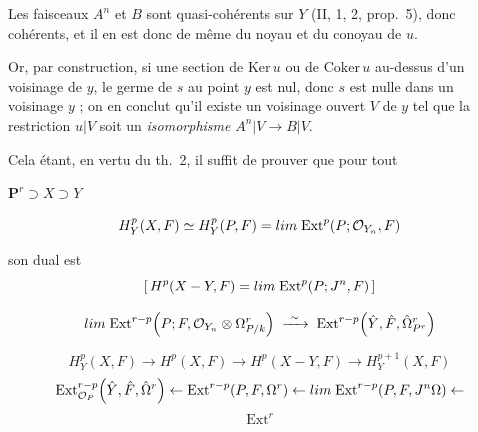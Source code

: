 \documentclass[11pt,a4paper]{article}
\begin{document}
Les faisceaux $A^{n}$ et $B$ sont quasi-cohérents sur $Y$ (II, 1, 2, prop.~5),
donc cohérents, et il en est donc de même du noyau et du conoyau de $u$.


Or, par construction, si  une section de $\mathrm{Ker}\,u$ ou de
$\mathrm{Coker}\,u$ au-dessus d'un voisinage de $y$, le germe de $s$ au point
$y$ est nul, donc $s$ est nulle dans un voisinage  $y$ ; on en conclut
qu'il existe un voisinage ouvert $V$ de $y$ tel que la restriction $u|V$ soit un
\emph{isomorphisme} $A^{n}|V \to B|V$.


Cela étant, en vertu du th.~2, il suffit de prouver que pour tout


\marginal{\ill{}}




 $\mathbf{P}^{r} \supset X \supset Y$

\[
  H^{p}_{Y}(X, F) \simeq H^{p}_{Y}(P, F) = \varinjlim\;
  \mathrm{Ext}^{p}\!\left(P; \mathcal{O}_{Y_{n}}, F\right)
\]

son dual est
\[
  \left[\,H^{p}(X - Y, F) = \varinjlim\;
  \mathrm{Ext}^{p}\!\left(P; J^{n}, F\right)\,\right]
\]

\[
  \varprojlim\; \mathrm{Ext}^{r-p}\!\left(P; F,
  \mathcal{O}_{Y_{n}} \otimes \Omega^{r}_{P/k}\right)
  \;\xrightarrow{\ \sim\ }\;
  \mathrm{Ext}^{r-p}\!\left(\hat{Y}, \hat{F}, \hat{\Omega}^{r}_{P^{r}}\right)
\]

\[
  H^{p}_{Y}(X, F) \to H^{p}(X, F) \to H^{p}(X - Y, F) \to H^{p+1}_{Y}(X, F)
\]
\[
  \mathrm{Ext}^{r-p}_{\mathcal{O}_{P}}\!\left(\hat{Y}, \hat{F}, \hat{\Omega}^{r}\right)
  \leftarrow \mathrm{Ext}^{r-p}\!\left(P, F, \Omega^{r}\right)
  \leftarrow \varprojlim\; \mathrm{Ext}^{r-p}\!\left(P, F, J^{n}\Omega\right)
  \leftarrow
\]
\[
  \mathrm{Ext}^{r}
\]
\end{document}
